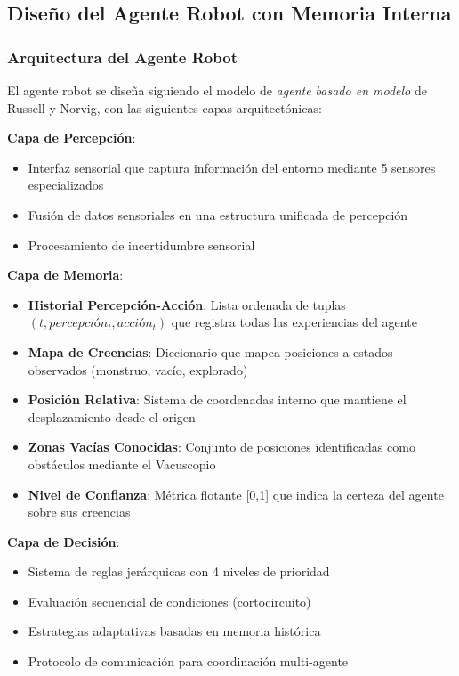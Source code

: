 \documentclass[10pt,twocolumn]{article}
\begin{document}
\subsection{Diseño del Agente Robot con Memoria Interna}

\subsubsection{Arquitectura del Agente Robot}

El agente robot se diseña siguiendo el modelo de \textit{agente basado en modelo} de Russell y Norvig, con las siguientes capas arquitectónicas:

\textbf{Capa de Percepción}:
\begin{itemize}
\item Interfaz sensorial que captura información del entorno mediante 5 sensores especializados
\item Fusión de datos sensoriales en una estructura unificada de percepción
\item Procesamiento de incertidumbre sensorial
\end{itemize}

\textbf{Capa de Memoria}:
\begin{itemize}
\item \textbf{Historial Percepción-Acción}: Lista ordenada de tuplas $(t, percepción_t, acción_t)$ que registra todas las experiencias del agente
\item \textbf{Mapa de Creencias}: Diccionario que mapea posiciones a estados observados (monstruo, vacío, explorado)
\item \textbf{Posición Relativa}: Sistema de coordenadas interno que mantiene el desplazamiento desde el origen
\item \textbf{Zonas Vacías Conocidas}: Conjunto de posiciones identificadas como obstáculos mediante el Vacuscopio
\item \textbf{Nivel de Confianza}: Métrica flotante [0,1] que indica la certeza del agente sobre sus creencias
\end{itemize}

\textbf{Capa de Decisión}:
\begin{itemize}
\item Sistema de reglas jerárquicas con 4 niveles de prioridad
\item Evaluación secuencial de condiciones (cortocircuito)
\item Estrategias adaptativas basadas en memoria histórica
\item Protocolo de comunicación para coordinación multi-agente
\end{itemize}
\end{document}
